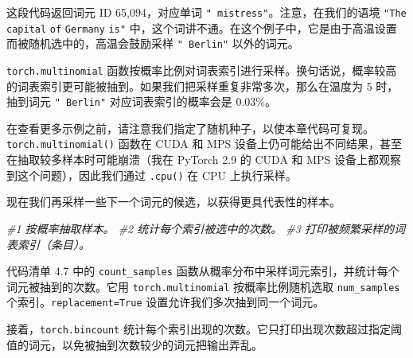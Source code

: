 这段代码返回词元 ID 65,094，对应单词 \texttt{"}\texttt{ mistress}\texttt{"}。注意，在我们的语境 \texttt{"}\texttt{The} \texttt{capital} \texttt{of} \texttt{Germany} \texttt{is}\texttt{"} 中，这个词讲不通。在这个例子中，它是由于高温设置而被随机选中的，高温会鼓励采样 \texttt{"}\texttt{ Berlin}\texttt{"} 以外的词元。

\texttt{torch.multinomial} 函数按概率比例对词表索引进行采样。换句话说，概率较高的词表索引更可能被抽到。如果我们把采样重复非常多次，那么在温度为 5 时，抽到词元 \texttt{"}\texttt{ Berlin}\texttt{"} 对应词表索引的概率会是 0.03\%。

在查看更多示例之前，请注意我们指定了随机种子，以使本章代码可复现。\texttt{torch.multinomial()} 函数在 CUDA 和 MPS 设备上仍可能给出不同结果，甚至在抽取较多样本时可能崩溃（我在 PyTorch 2.9 的 CUDA 和 MPS 设备上都观察到这个问题），因此我们通过 \texttt{.cpu()} 在 CPU 上执行采样。

现在我们再采样一些下一个词元的候选，以获得更具代表性的样本。

{\noindent\small\textit{\#1 按概率抽取样本。 \newline \#2 统计每个索引被选中的次数。 \newline \#3 打印被频繁采样的词表索引（条目）。}\par}

代码清单 4.7 中的 \texttt{count\_samples} 函数从概率分布中采样词元索引，并统计每个词元被抽到的次数。它用 \texttt{torch.multinomial} 按概率比例随机选取 \texttt{num\_samples} 个索引。\texttt{replacement=True} 设置允许我们多次抽到同一个词元。

接着，\texttt{torch.bincount} 统计每个索引出现的次数。它只打印出现次数超过指定阈值的词元，以免被抽到次数较少的词元把输出弄乱。

